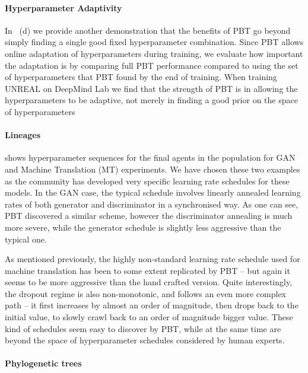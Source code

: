 \paragraph{Hyperparameter Adaptivity}\label{sec:analysis_hyper_adapt}

In ~(d) we provide another demonstration that the benefits of PBT go beyond simply finding a single good fixed hyperparameter combination. Since PBT allows online adaptation of hyperparameters during training, we evaluate how important the adaptation is by comparing full PBT performance compared to using the set of hyperparameters that PBT found by the end of training. When training UNREAL on DeepMind Lab we find that the strength of PBT is in allowing the hyperparameters to be adaptive, not merely in finding a good prior on the space of hyperparameters


\paragraph{Lineages}\label{sec:analysis_lineage}

 shows hyperparameter sequences for the final agents in the population for GAN and Machine Translation (MT) experiments. We have chosen these two examples as the community has developed very specific learning rate schedules for these models. In the GAN case, the typical schedule involves linearly annealed learning rates of both generator and discriminator in a synchronised way. As one can see, PBT discovered a similar scheme, however the discriminator annealing is much more severe, while the generator schedule is slightly less aggressive than the typical one. 

As mentioned previously, the highly non-standard learning rate schedule used for machine translation has been to some extent replicated by PBT -- but again it seems to be more aggressive than the hand crafted version. Quite interestingly, the dropout regime is also non-monotonic, and follows an even more complex path -- it first increases by almost an order of magnitude, then drops back to the initial value, to slowly crawl back to an order of magnitude bigger value. These kind of schedules seem easy to discover by PBT, while at the same time are beyond the space of hyperparameter schedules considered by human experts.



\paragraph{Phylogenetic trees}\label{sec:analysis_phylogenetic}

